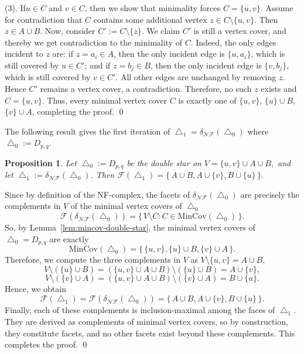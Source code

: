 \documentclass[12pt]{article}
\renewenvironment{proof}{{\noindent\bfseries Proof.}}{\qed}
\theoremstyle{plain}
\newtheorem{proposition}[theorem]{Proposition}
\theoremstyle{definition}
\newcommand{\F}{\mathcal{F}}
\newcommand{\MIN}{\mathrm{MinCov}}
\begin{document}
\begin{proof}
			\smallskip\noindent
			(3). If\(u\in C\) and \(v\in C\), then we show that minimality forces \(C=\{u,v\}\). 	Assume for contradiction that \(C\) contains some additional vertex \(z\in C\setminus\{u,v\}\).  Then \(z\in A\cup B\). Now, consider \(C':=C\setminus\{z\}\).
			We claim \(C'\) is still a vertex cover, and thereby we get contradiction to the minimality of \(C\).  Indeed, the only edges incident to \(z\) are:  if \(z=a_i\in A\), then the only incident edge is \(\{u,a_i\}\), which is still covered by \(u\in C'\); and  if \(z=b_j\in B\), then the only incident edge is \(\{v,b_j\}\), which is still covered by \(v\in C'\). 	All other edges are unchanged by removing \(z\). Hence \(C'\) remains a vertex cover, a contradiction.
			Therefore, no such \(z\) exists and \(C=\{u,v\}\). Thus, every minimal vertex cover \(C\) is exactly one of
			\(\{u,v\}\), \(\{u\}\cup B\), \(\{v\}\cup A\), completing the proof.
		\end{proof}
		
		\medskip
		The following result gives the first iteration of \(\bigtriangleup_1=\delta_{\mathcal{NF}}(\bigtriangleup_0)\) where $ \bigtriangleup_0:=D_{p,q}.$
		\begin{proposition}\label{prop:NF1-double-star}
			Let \(\bigtriangleup_0:=D_{p,q}\) be the double star on $V=\{u,v\}\cup A\cup B,$ 
			and let \(\bigtriangleup_1:=\delta_{\mathcal{NF}}(\bigtriangleup_0)\). Then
			 $\F(\bigtriangleup_1)=\bigl\{\,A\cup B, A\cup\{v\}, B\cup\{u\}\,\bigr\}.$ 
		\end{proposition}
		
		\begin{proof}
			Since by definition of the NF-complex,	the facets of \(\delta_{\mathcal{NF}}(\bigtriangleup_0)\) are precisely the complements in \(V\) of the minimal vertex covers of \(\bigtriangleup_0\)
			\[
			\F(\delta_{\mathcal{NF}}(\bigtriangleup_0))=\bigl\{\,V\setminus C : C\in \MIN(\bigtriangleup_0)\,\bigr\}.
			\]
			So, by Lemma~\ref{lem:mincov-double-star}, the minimal vertex covers of \(\bigtriangleup_0=D_{p,q}\) are exactly
			\[
			\MIN(\bigtriangleup_0)=\bigl\{\,\{u,v\}, \{u\}\cup B, \{v\}\cup A\,\bigr\}.
			\]
			Therefore, we compute the three complements in \(V\) as
			 $V\setminus\{u,v\}  =  A\cup B,$ 
			\[
			V\setminus(\{u\}\cup B)  =  (\{u,v\}\cup A\cup B)\setminus(\{u\}\cup B)
			 =  A\cup\{v\},
			\]
			\[
			V\setminus(\{v\}\cup A)  =  (\{u,v\}\cup A\cup B)\setminus(\{v\}\cup A)
			 =  B\cup\{u\}.
			\]
			Hence, we obtain
			\[
			\F(\bigtriangleup_1)=\F(\delta_{\mathcal{NF}}(\bigtriangleup_0))
			=\bigl\{\,A\cup B, A\cup\{v\}, B\cup\{u\}\,\bigr\}.
			\]
			Finally, each of these complements is inclusion-maximal among the faces of \(\bigtriangleup_1\). They are derived as complements of minimal vertex covers, so by construction, they constitute facets, and no other facets exist beyond these complements. This completes the proof.
		\end{proof}
		
\end{document}
